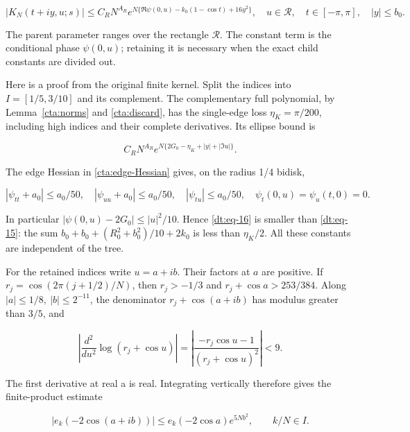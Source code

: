 \begin{equation}\label{dt:eq-15}
|K_N(t+iy,u;s)|\le C_RN^{A_R}
 e^{N\{\Re\psi(0,u)-k_0(1-\cos t)+16y^2\}},
 \quad u\in\mathcal R,\quad t\in[-\pi,\pi],\quad |y|\le b_0.
\end{equation}

The parent parameter ranges over the rectangle \(\mathcal R\).
The constant term is the conditional phase \(\psi(0,u)\); retaining it
is necessary when the exact child constants are divided out.

Here is a proof from the original finite kernel. Split the indices into
\(I=[1/5,3/10]\) and its complement. The complementary full polynomial, by Lemma~\ref{cta:norms} and \eqref{cta:discard}, has the single-edge loss \(\eta_K=\pi/200\), including high
indices and their complete derivatives. Its ellipse bound is

\begin{equation}\label{dt:eq-16}
C_RN^{A_R}
       e^{N\{2G_0-\eta_K+|y|+|\Im u|\}}.
\end{equation}

The edge Hessian in \eqref{cta:edge-Hessian} gives, on the radius 1/4 bidisk,

\begin{equation}\label{dt:eq-17}
|\psi_{tt}+a_0|\le a_0/50,
 \quad |\psi_{uu}+a_0|\le a_0/50,
 \quad |\psi_{tu}|\le a_0/50,
 \quad \psi_t(0,u)=\psi_u(t,0)=0.
\end{equation}

In particular \(|\psi(0,u)-2G_0|\le |u|^2/10\). Hence \eqref{dt:eq-16} is smaller
than \eqref{dt:eq-15}: the sum \(b_0+b_0+(R_0^2+b_0^2)/10+2k_0\) is less
than \(\eta_K/2\). All these constants are independent of the tree.

For the retained indices write \(u=a+ib\). Their factors at \(a\) are positive.
If \(r_j=\cos(2\pi(j+1/2)/N)\), then \(r_j>-1/3\) and
\(r_j+\cos a>253/384\). Along \(|a|\le1/8,\ |b|\le2^{-11}\), the denominator
\(r_j+\cos(a+ib)\) has modulus greater than \(3/5\), and

\begin{equation}\label{dt:eq-18}
\left|\frac{d^2}{du^2}\log(r_j+\cos u)\right|
 =\left|\frac{-r_j\cos u-1}{(r_j+\cos u)^2}\right|<9.
\end{equation}

The first derivative at real a is real. Integrating vertically therefore
gives the finite-product estimate

\begin{equation}\label{dt:eq-19}
|e_k(-2\cos(a+ib))|
       \le e_k(-2\cos a)e^{5Nb^2},\qquad k/N\in I.
\end{equation}

